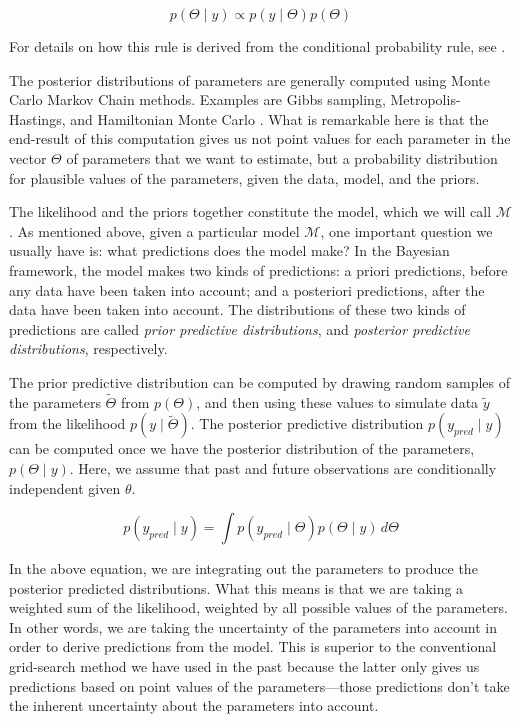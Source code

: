 \documentclass{cambridge7A}\usepackage[]{graphicx}\usepackage[]{color}
\begin{document}
\begin{equation}
p(\Theta\mid y ) \propto p(y\mid \Theta)p(\Theta)
\end{equation}

For details on how this rule is derived from the conditional probability rule, see \cite{blitzstein2014introduction}.

The posterior distributions of parameters are generally computed using   Monte Carlo Markov Chain methods. Examples are  Gibbs sampling,  Metropolis-Hastings, and  Hamiltonian Monte Carlo \citep{lunn2012bugs,Gelman14}. What is remarkable here is that the end-result of this computation gives us not point values for each parameter in the vector $\Theta$ of parameters that we want to estimate, but a probability distribution for plausible values of the parameters, given the data, model, and the priors. 

The likelihood and the priors together constitute the model, which we will call $\mathcal{M}$. As mentioned above, given a particular model  $\mathcal{M}$, one important question we usually have is: what predictions does the model make? In the Bayesian framework, the model makes two kinds of predictions: a priori predictions, before any data have been taken into account; and a posteriori predictions, after the data have been taken into account.  The distributions of these two kinds of predictions are called  \textit{prior predictive distributions}, and  \textit{posterior predictive distributions}, respectively. 

The prior predictive distribution can be computed by drawing random samples of the parameters $\tilde{\Theta}$ from $p(\Theta)$, and then using these values to simulate data $\tilde{y}$ from the likelihood $p(y\mid \tilde{\Theta})$. The posterior predictive distribution $p(y_{pred}\mid y)$ can be computed once we have the posterior distribution of the parameters, $p(\Theta \mid y)$. Here, we assume that past and future observations are conditionally independent given $\theta$.

\begin{equation}
p(y_{pred}\mid y) = \int p(y_{pred} \mid \Theta) p(\Theta \mid y)\, d\Theta
\end{equation}

In the above equation, we are integrating out the parameters to produce the posterior predicted distributions. What this means is that we are taking a weighted sum of the likelihood, weighted by all possible values of the parameters.  
In other words, we are taking the uncertainty of the parameters into account in order to derive predictions from the model. This is superior to the conventional grid-search method we have used in the past because the latter only gives us predictions based on point values of the parameters---those predictions don't take the inherent uncertainty about the parameters into account.
\end{document}
